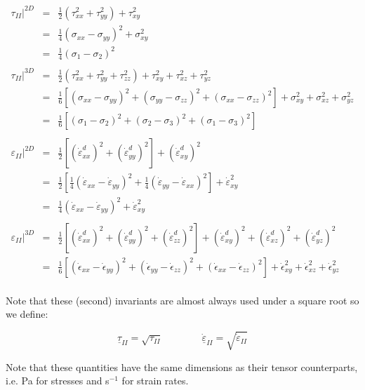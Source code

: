 \begin{eqnarray}
\tau_{II}|^{2D}            &=& \frac{1}{2} ( \tau_{xx}^2 + \tau_{yy}^2  ) + \tau_{xy}^2   \nonumber\\
           &=& \frac{1}{4} (\sigma_{xx} - \sigma_{yy})^2 + \sigma_{xy}^2 \nonumber\\
           &=& \frac{1}{4} (\sigma_{1} - \sigma_{2})^2 \nonumber\\
\nonumber\\
\tau_{II}|^{3D}        &=& \frac{1}{2} ( \tau_{xx}^2 + \tau_{yy}^2 + \tau_{zz}^2 ) + \tau_{xy}^2 + \tau_{xz}^2 + \tau_{yz}^2  \nonumber\\
           &=& \frac{1}{6} \left[ (\sigma_{xx}-\sigma_{yy})^2 + (\sigma_{yy}-\sigma_{zz})^2 + (\sigma_{xx}-\sigma_{zz})^2 \right] 
               + \sigma_{xy}^2 + \sigma_{xz}^2 + \sigma_{yz}^2 \nonumber \\
           &=& \frac{1}{6} \left[ (\sigma_{1}-\sigma_{2})^2 + (\sigma_{2}-\sigma_{3})^2 + (\sigma_{1}-\sigma_{3})^2 \right] \nonumber\\
\nonumber\\
\varepsilon_{II}|^{2D} 
           &=& \frac{1}{2} \left[ (\dot{\varepsilon}_{xx}^d)^2 + (\dot{\varepsilon}_{yy}^d)^2  \right] + (\dot{\varepsilon}_{xy}^d)^2  \nonumber\\
           &=& \frac{1}{2} \left[ 
               \frac{1}{4}(\dot{\varepsilon}_{xx} - \dot{\varepsilon}_{yy})^2 + \frac{1}{4}(\dot{\varepsilon}_{yy} - \dot{\varepsilon}_{xx})^2 
               \right] + \dot{\varepsilon}_{xy}^2  \nonumber\\
           &=& \frac{1}{4} (\dot{\varepsilon}_{xx} - \dot{\varepsilon}_{yy})^2  + \dot{\varepsilon}_{xy}^2  \nonumber\\
\nonumber\\
\varepsilon_{II}|^{3D} 
&=& \frac{1}{2} \left[ (\dot{\varepsilon}_{xx}^d)^2 + (\dot{\varepsilon}_{yy}^d)^2 + (\dot{\varepsilon}_{zz}^d)^2   \right] 
+ (\dot{\varepsilon}_{xy}^d)^2  
+ (\dot{\varepsilon}_{xz}^d)^2  
+ (\dot{\varepsilon}_{yz}^d)^2  \nonumber\\
           &=& \frac{1}{6} \left[ (\dot{\epsilon}_{xx}-\dot{\epsilon}_{yy})^2 + (\dot{\epsilon}_{yy}-\dot{\epsilon}_{zz})^2 + (\dot{\epsilon}_{xx}-\dot{\epsilon}_{zz})^2 \right] 
               + \dot{\epsilon}_{xy}^2 + \dot{\epsilon}_{xz}^2 + \dot{\epsilon}_{yz}^2 \nonumber \\
\nonumber
\end{eqnarray}

Note that these (second) invariants are almost always used under a square root so we define:
\begin{mdframed}[backgroundcolor=blue!5]
\[
\underline{\tau}_{II}=\sqrt{\tau_{II}}
\quad\quad
\quad\quad
\dot{\underline{\varepsilon}}_{II}=\sqrt{\dot\varepsilon_{II}}
\]
\end{mdframed}
Note that these quantities have the same dimensions as their tensor counterparts, i.e. Pa for stresses and s$^{-1}$ for strain rates.

